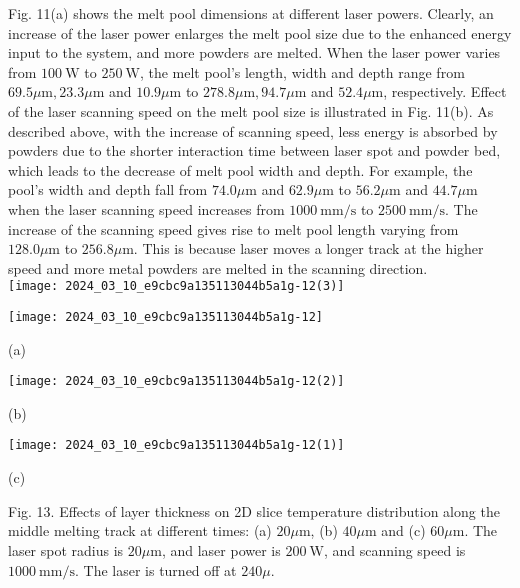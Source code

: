\documentclass[10pt]{article}
\begin{document}
Fig. 11(a) shows the melt pool dimensions at different laser powers. Clearly, an increase of the laser power enlarges the melt pool size due to the enhanced energy input to the system, and more powders are melted. When the laser power varies from $100 \mathrm{~W}$ to $250 \mathrm{~W}$, the melt pool's length, width and depth range from $69.5 \mu \mathrm{m}, 23.3 \mu \mathrm{m}$ and $10.9 \mu \mathrm{m}$ to $278.8 \mu \mathrm{m}, 94.7 \mu \mathrm{m}$ and $52.4 \mu \mathrm{m}$, respectively. Effect of the laser scanning speed on the melt pool size is illustrated in Fig. 11(b). As described above, with the increase of scanning speed, less energy is absorbed by powders due to the shorter interaction time between laser spot and powder bed, which leads to the decrease of melt pool width and depth. For example, the pool's width and depth fall from $74.0 \mu \mathrm{m}$ and $62.9 \mu \mathrm{m}$ to $56.2 \mu \mathrm{m}$ and $44.7 \mu \mathrm{m}$ when the laser scanning speed increases from $1000 \mathrm{~mm} / \mathrm{s}$ to $2500 \mathrm{~mm} / \mathrm{s}$. The increase of the scanning speed gives rise to melt pool length varying from $128.0 \mu \mathrm{m}$ to $256.8 \mu \mathrm{m}$. This is because laser moves a longer track at the higher speed and more metal powders are melted in the scanning direction.\\
\texttt{[image: 2024\_03\_10\_e9cbc9a135113044b5a1g-12(3)]}

\begin{center}
\texttt{[image: 2024\_03\_10\_e9cbc9a135113044b5a1g-12]}
\end{center}

(a)

\begin{center}
\texttt{[image: 2024\_03\_10\_e9cbc9a135113044b5a1g-12(2)]}
\end{center}

(b)

\begin{center}
\texttt{[image: 2024\_03\_10\_e9cbc9a135113044b5a1g-12(1)]}
\end{center}

(c)

Fig. 13. Effects of layer thickness on 2D slice temperature distribution along the middle melting track at different times: (a) $20 \mu \mathrm{m}$, (b) $40 \mu \mathrm{m}$ and (c) $60 \mu \mathrm{m}$. The laser spot radius is $20 \mu \mathrm{m}$, and laser power is $200 \mathrm{~W}$, and scanning speed is $1000 \mathrm{~mm} / \mathrm{s}$. The laser is turned off at $240 \mu$.
\end{document}
